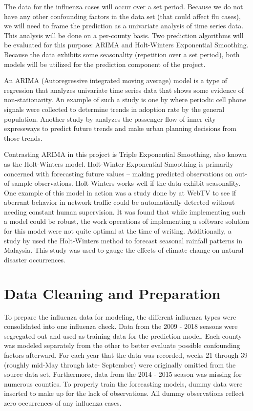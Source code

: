 \documentclass[12pt]{article}
\begin{document}
The data for the influenza cases will occur over a set period. Because we do not have any other confounding factors in the data set (that could affect flu cases), we will need to frame the prediction as a univariate analysis of time series data. This analysis will be done on a per-county basis. Two prediction algorithms will be evaluated for this purpose: ARIMA and Holt-Winters Exponential Smoothing. Because the data exhibits some seasonality (repetition over a set period), both models will be utilized for the prediction component of the project.

An ARIMA (Autoregressive integrated moving average) model is a type of regression that analyzes univariate time series data that shows some evidence of non-stationarity. An example of such a study is one by \cite{agris} where periodic cell phone signals were collected to determine trends in adoption rate by the general population. Another study by \cite{transportation} analyzes the passenger flow of inner-city expressways to predict future trends and make urban planning decisions from those trends.

Contrasting ARIMA in this project is Triple Exponential Smoothing, also known as the Holt-Winters model. Holt-Winter Exponential Smoothing is primarily concerned with forecasting future values – making predicted observations on out-of-sample observations. Holt-Winters works well if the data exhibit seasonality. One example of this model in action was a study done by \cite{usenix} at WebTV to see if aberrant behavior in network traffic could be automatically detected without needing constant human supervision. It was found that while implementing such a model could be robust, the work operations of implementing a software solution for this model were not quite optimal at the time of writing. Additionally, a study by \cite{earth} used the Holt-Winters method to forecast seasonal rainfall patterns in Malaysia. This study was used to gauge the effects of climate change on natural disaster occurrences.

\section{Data Cleaning and Preparation}

To prepare the influenza data for modeling, the different influenza types were consolidated into one influenza check. Data from the 2009 - 2018 seasons were segregated out and used as training data for the prediction model. Each county was modeled separately from the other to better evaluate possible confounding factors afterward. For each year that the data was recorded, weeks 21 through 39 (roughly mid-May through late- September) were originally omitted from the source data set. Furthermore, data from the 2014 - 2015 season was missing for numerous counties. To properly train the forecasting models, dummy data were inserted to make up for the lack of observations. All dummy observations reflect zero occurrences of any influenza cases.
\end{document}
